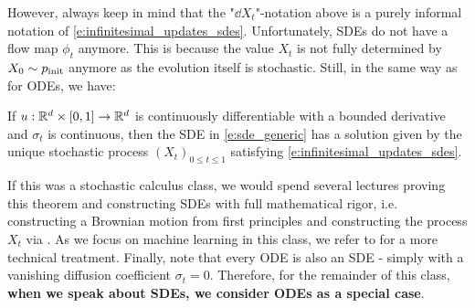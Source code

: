 However, always keep in mind that the "$\dd X_t$"-notation above is a purely informal notation of \cref{e:infinitesimal_updates_sdes}. Unfortunately, SDEs do not have a flow map $\phi_t$ anymore. This is because the value $X_t$ is not fully determined by $X_0\sim p_{\rm{init}}$ anymore as the evolution itself is stochastic. Still, in the same way as for ODEs, we have:
\begin{theorem}
\label{thm:sde_existence_and_uniqueness}
If $u:\mathbb{R}^d\times[0,1]\to\mathbb{R}^d$ is continuously differentiable with a bounded derivative and $\sigma_t$ is continuous, then the SDE in \eqref{e:sde_generic} has a solution given by the unique stochastic process $(X_t)_{0\leq t\leq 1}$ satisfying \cref{e:infinitesimal_updates_sdes}.
\end{theorem}
If this was a stochastic calculus class, we would spend several lectures proving this theorem and constructing SDEs with full mathematical rigor, i.e. constructing a Brownian motion from first principles and constructing the process $X_{t}$ via . As we focus on machine learning in this class, we refer to \citep{mao2007stochastic} for a more technical treatment. Finally, note that every ODE is also an SDE - simply with a vanishing diffusion coefficient $\sigma_t=0$. Therefore, for the remainder of this class, \textbf{when we speak about SDEs, we consider ODEs as a special case}.

